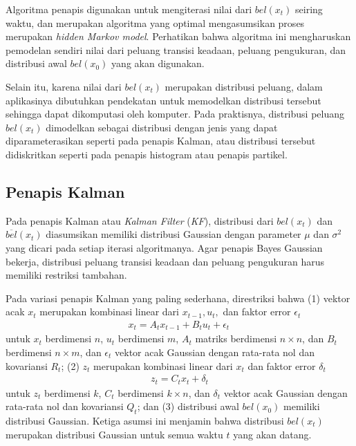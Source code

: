 Algoritma penapis digunakan untuk mengiterasi nilai dari $bel(x_t)$ seiring waktu, dan merupakan algoritma yang optimal mengasumsikan proses merupakan \textit{hidden Markov model}. Perhatikan bahwa algoritma ini mengharuskan pemodelan sendiri nilai dari peluang transisi keadaan, peluang pengukuran, dan distribusi awal $bel(x_0)$ yang akan digunakan.

Selain itu, karena nilai dari $bel(x_t)$ merupakan distribusi peluang, dalam aplikasinya dibutuhkan pendekatan untuk memodelkan distribusi tersebut sehingga dapat dikomputasi oleh komputer. Pada praktisnya, distribusi peluang $bel(x_t)$ dimodelkan sebagai distribusi dengan jenis yang dapat diparameterasikan seperti pada penapis Kalman, atau distribusi tersebut didiskritkan seperti pada penapis histogram atau penapis partikel.

\subsection{Penapis Kalman}

Pada penapis Kalman atau \textit{Kalman Filter} (\textit{KF}), distribusi dari $bel(x_t)$ dan $\overline{bel}(x_t)$ diasumsikan memiliki distribusi Gaussian dengan parameter $\mu$ dan $\sigma^2$ yang dicari pada setiap iterasi algoritmanya. Agar penapis Bayes Gaussian bekerja, distribusi peluang transisi keadaan dan peluang pengukuran harus memiliki restriksi tambahan.

Pada variasi penapis Kalman yang paling sederhana, direstriksi bahwa (1) vektor acak $x_t$ merupakan kombinasi linear dari $x_{t-1}, u_t,$ dan faktor error $\epsilon_t$
\begin{align}
    x_t = A_t x_{t-1} + B_t u_t + \epsilon_t \,
\end{align}
untuk $x_t$ berdimensi $n$, $u_t$ berdimensi $m$, $A_t$ matriks berdimensi $n \times n$, dan $B_t$ berdimensi $n \times m$, dan $\epsilon_t$ vektor acak Gaussian dengan rata-rata nol dan kovariansi $R_t$; (2) $z_t$ merupakan kombinasi linear dari $x_t$ dan faktor error $\delta_t$
\begin{align}
    z_t = C_t x_t + \delta_t
\end{align}
untuk $z_t$ berdimensi $k$, $C_t$ berdimensi $k \times n$, dan $\delta_t$ vektor acak Gaussian dengan rata-rata nol dan kovariansi $Q_t$; dan (3) distribusi awal $bel(x_0)$ memiliki distribusi Gaussian. Ketiga asumsi ini menjamin bahwa distribusi $bel(x_t)$ merupakan distribusi Gaussian untuk semua waktu $t$ yang akan datang.

